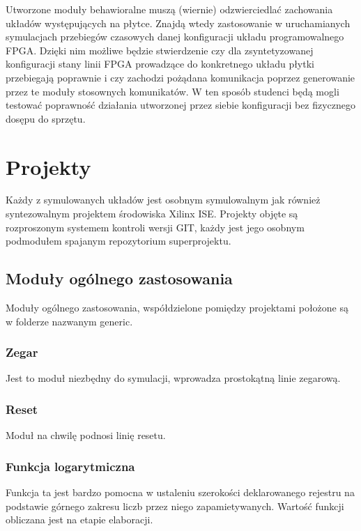 \documentclass[a4paper,12pt]{article}
\begin{document}
Utworzone moduły behawioralne muszą (wiernie) odzwierciedlać zachowania układów występujących na płytce.
Znajdą wtedy zastosowanie w uruchamianych symulacjach przebiegów czasowych danej konfiguracji układu programowalnego FPGA. Dzięki nim możliwe będzie stwierdzenie czy dla zsyntetyzowanej konfiguracji stany linii FPGA prowadzące do konkretnego układu płytki przebiegają poprawnie i czy zachodzi pożądana komunikacja poprzez generowanie przez te moduły stosownych komunikatów. W ten sposób studenci będą mogli testować poprawność działania utworzonej przez siebie konfiguracji bez fizycznego dosępu do sprzętu.


\newpage
\section{Projekty}
Każdy z symulowanych układów jest osobnym symulowalnym jak również syntezowalnym projektem środowiska Xilinx ISE. Projekty objęte są rozproszonym systemem kontroli wersji GIT, każdy jest jego osobnym podmodułem spajanym repozytorium superprojektu.

\subsection{Moduły ogólnego zastosowania}
Moduły ogólnego zastosowania, współdzielone pomiędzy projektami położone są w folderze nazwanym generic.

\subsubsection{Zegar}
Jest to moduł niezbędny do symulacji, wprowadza prostokątną linie zegarową.


\subsubsection{Reset}
Moduł na chwilę podnosi linię resetu.


\subsubsection{Funkcja logarytmiczna}
Funkcja ta jest bardzo pomocna w ustaleniu szerokości deklarowanego rejestru na podstawie górnego zakresu liczb przez niego zapamietywanych. Wartość funkcji obliczana jest na etapie elaboracji.

\end{document}
